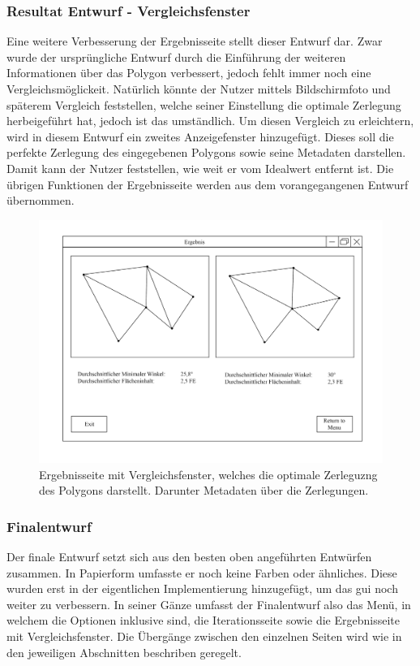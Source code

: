 \subsubsection{Resultat Entwurf - Vergleichsfenster}
Eine weitere Verbesserung der Ergebnisseite stellt dieser Entwurf dar. Zwar wurde der ursprüngliche Entwurf durch die Einführung der weiteren Informationen über das Polygon verbessert, jedoch fehlt immer noch eine Vergleichsmöglickeit.
Natürlich könnte der Nutzer mittels Bildschirmfoto und späterem Vergleich feststellen, welche seiner Einstellung die optimale Zerlegung herbeigeführt hat, jedoch ist das umständlich.
Um diesen Vergleich zu erleichtern, wird in diesem Entwurf ein zweites Anzeigefenster hinzugefügt. Dieses soll die perfekte Zerlegung des eingegebenen Polygons sowie seine Metadaten darstellen.
Damit kann der Nutzer feststellen, wie weit er vom Idealwert entfernt ist. Die übrigen Funktionen der Ergebnisseite werden aus dem vorangegangenen Entwurf übernommen.

\begin{figure}[h]
    \includegraphics[width=1\textwidth]{bilder/ergebnis_vergleich.png}
    \caption[Entwurf Ergebnisseite mit Vergleichsfenster]{Ergebnisseite mit Vergleichsfenster, welches die optimale Zerleguzng des Polygons darstellt. Darunter Metadaten über die Zerlegungen.}
    \label{fig:ergebnis_vergleich}
\end{figure}

\subsubsection{Finalentwurf}
Der finale Entwurf setzt sich aus den besten oben angeführten Entwürfen zusammen. In Papierform umfasste er noch keine Farben oder ähnliches. Diese wurden erst in der eigentlichen Implementierung hinzugefügt, um das \ac{gui} noch weiter zu verbessern.
In seiner Gänze umfasst der Finalentwurf also das Menü, in welchem die Optionen inklusive sind, die Iterationsseite sowie die Ergebnisseite mit Vergleichsfenster. Die Übergänge zwischen den einzelnen Seiten wird wie in den jeweiligen Abschnitten beschriben geregelt.


